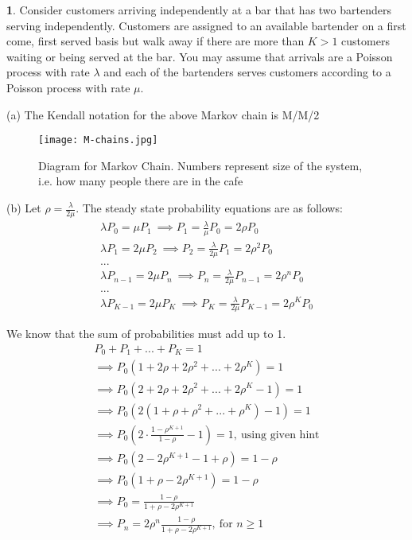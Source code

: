 \textbf{1}. Consider customers arriving independently at a bar that has two bartenders serving independently. Customers are assigned to an available bartender on a first come, first served basis
but walk away if there are more than $K > 1$ customers waiting or being served at the bar. You
may assume that arrivals are a Poisson process with rate $\lambda$ and each of the bartenders serves
customers according to a Poisson process with rate $\mu$.

(a) 
The Kendall notation for the above Markov chain is M/M/2
\begin{figure}[H]
\centering
\texttt{[image: M-chains.jpg]}
\caption{\label{fig:M-chains}Diagram for Markov Chain. Numbers represent size of the system, i.e. how many people there are in the cafe}
\end{figure}

(b) Let $\rho = \frac{\lambda}{2\mu}$. The steady state probability equations are as follows:
\begin{gather*}
\lambda P_0  = \mu P_1\ \implies P_1 = \frac{\lambda}{\mu}P_0 = 2\rho P_0\\
\lambda P_1 = 2\mu P_2\ \implies P_2 = \frac{\lambda}{2\mu}P_1 = 2\rho^2 P_0\\
...\\
\lambda P_{n-1} = 2\mu P_{n}\ \implies P_n = \frac{\lambda}{2\mu}P_{n-1} = 2\rho^n P_0\\
...\\
\lambda P_{K-1} = 2\mu P_{K}\ \implies P_K = \frac{\lambda}{2\mu}P_{K-1} = 2\rho^K P_0
\end{gather*}

We know that the sum of probabilities must add up to 1.
\begin{gather*}
P_0 + P_1 + ... + P_K = 1\\
\implies P_0(1 + 2\rho + 2\rho^2 + ... + 2\rho^K) = 1\\
\implies P_0(2 + 2\rho + 2\rho^2 + ... + 2\rho^K-1) = 1\\
\implies P_0(2(1 + \rho + \rho^2 + ... + \rho^K) - 1) = 1\\
\implies P_0(2\cdot \frac{1 - \rho^{K+1}}{1-\rho} - 1) = 1, \ \text{using given hint} \\
\implies P_0(2 - 2\rho^{K+1} - 1 + \rho) = 1 - \rho\\
\implies P_0(1 + \rho - 2\rho^{K+1}) = 1 - \rho\\
\implies P_0 = \frac{1-\rho}{1+\rho - 2\rho^{K+1}}\\
\implies P_n = 2\rho^n\frac{1-\rho}{1+\rho - 2\rho^{K+1}},\ \text{for $n\ge1$}
\end{gather*}


